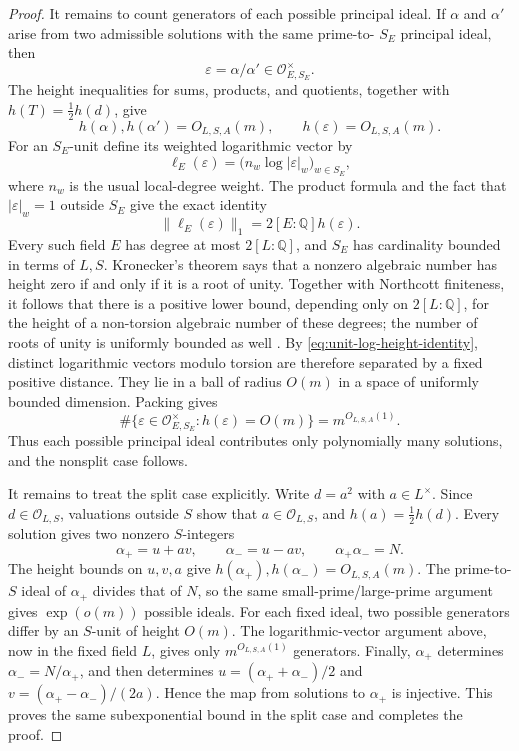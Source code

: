 \documentclass[11pt,reqno]{amsart}
\theoremstyle{definition}
\theoremstyle{remark}
\newcommand{\Q}{\mathbb Q}
\newcommand{\cO}{\mathcal O}
\begin{document}
\begin{proof}
It remains to count generators of each possible principal ideal.  If
\(\alpha\) and \(\alpha'\) arise from two admissible solutions with the same prime-to-
\(S_E\) principal ideal, then
\[
 \varepsilon=\alpha/\alpha'\in\cO_{E,S_E}^{\times}.
\]
The height inequalities for sums, products, and quotients, together with
\(h(T)=\tfrac12h(d)\), give
\[
 h(\alpha),h(\alpha')=O_{L,S,A}(m),\qquad
 h(\varepsilon)=O_{L,S,A}(m).
\]
For an \(S_E\)-unit define its weighted logarithmic vector by
\[
 \ell_E(\varepsilon)
   =\bigl(n_w\log|\varepsilon|_w\bigr)_{w\in S_E},
\]
where \(n_w\) is the usual local-degree weight.  The product formula and
the fact that \(|\varepsilon|_w=1\) outside \(S_E\) give the exact identity
\begin{equation}\label{eq:unit-log-height-identity}
 \|\ell_E(\varepsilon)\|_1
 =2[E:\Q]h(\varepsilon).
\end{equation}
Every such field \(E\) has degree at most \(2[L:\Q]\), and \(S_E\) has
cardinality bounded in terms of \(L,S\).  Kronecker's theorem says that a
nonzero algebraic number has height zero if and only if it is a root of unity.  Together with
Northcott finiteness, it follows that there is a positive lower bound,
depending only on \(2[L:\Q]\), for the height of a non-torsion algebraic
number of these degrees; the number of roots of unity is uniformly bounded
as well \cite[Sections~1.5--1.6]{BombieriGubler}.  By
\eqref{eq:unit-log-height-identity}, distinct logarithmic vectors modulo
torsion are therefore separated by a fixed positive distance.  They lie in
a ball of radius \(O(m)\) in a space of uniformly bounded dimension.
Packing gives
\[
 \#\{\varepsilon\in\cO_{E,S_E}^{\times}:h(\varepsilon)=O(m)\}
 =m^{O_{L,S,A}(1)}.
\]
Thus each possible principal ideal contributes only polynomially many
solutions, and
the nonsplit case follows.

It remains to treat the split case explicitly.  Write \(d=a^2\) with
\(a\in L^\times\).  Since \(d\in\cO_{L,S}\), valuations outside \(S\)
show that \(a\in\cO_{L,S}\), and \(h(a)=\tfrac12h(d)\).  Every solution
gives two nonzero \(S\)-integers
\[
 \alpha_+=u+av,\qquad \alpha_-=u-av,\qquad
 \alpha_+\alpha_-=N.
\]
The height bounds on \(u,v,a\) give
\(h(\alpha_+),h(\alpha_-)=O_{L,S,A}(m)\).  The prime-to-\(S\) ideal of
\(\alpha_+\) divides that of \(N\), so the
same small-prime/large-prime argument gives \(\exp(o(m))\) possible ideals.
For each fixed ideal, two possible generators differ by an \(S\)-unit of
height \(O(m)\).  The logarithmic-vector argument above, now in the fixed
field \(L\), gives only \(m^{O_{L,S,A}(1)}\) generators.  Finally,
\(\alpha_+\) determines \(\alpha_-=N/\alpha_+\), and then determines
\(u=(\alpha_++\alpha_-)/2\) and
\(v=(\alpha_+-\alpha_-)/(2a)\).  Hence the map from solutions to
\(\alpha_+\) is injective.  This proves the same subexponential bound in
the split case and completes the proof.
\end{proof}
\end{document}

